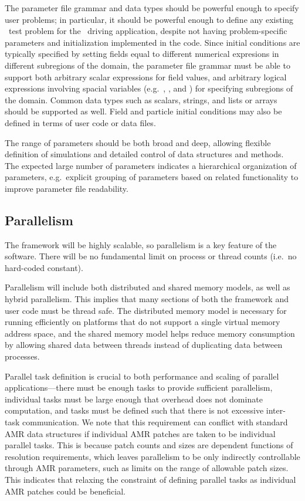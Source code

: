 \documentclass[10pt]{article}
\begin{document}
The parameter file grammar and data types should be powerful enough to
specify user problems; in particular, it should be powerful enough to
define any existing \enzo\ test problem for the \enzoii\ driving
application, despite not having problem-specific parameters and
initialization implemented in the code.  Since initial conditions are
typically specified by setting fields equal to different numerical
expresions in different subregions of the domain, the parameter file
grammar must be able to support both arbitrary scalar expressions for
field values, and arbitrary logical expressions involving spacial
variables (e.g.~, , and ) for specifying
subregions of the domain.  Common data types such as scalars, strings,
and lists or arrays should be supported as well.  Field and particle
initial conditions may also be defined in terms of user code or data
files.

The range of parameters should be both broad and deep, allowing
flexible definition of simulations and detailed control of data
structures and methods.  The expected large number of parameters
indicates a hierarchical organization of parameters, e.g.~explicit
grouping of parameters based on related functionality to improve
parameter file readability.

\subsection{Parallelism} \label{ss:require-parallel}

The framework will be highly scalable, so parallelism is a key
feature of the software.  There will be no fundamental limit on
process or thread counts (i.e.~no hard-coded  constant).

Parallelism will include both distributed and shared memory models, as
well as hybrid parallelism.  This implies that many sections of both
the framework and user code must be thread safe.  The distributed
memory model is necessary for running efficiently on platforms that do
not support a single virtual memory address space, and the shared
memory model helps reduce memory consumption by allowing shared data
between threads instead of duplicating data between processes.

Parallel task definition is crucial to both performance and scaling of
parallel applications---there must be enough tasks to provide
sufficient parallelism, individual tasks must be large enough that
overhead does not dominate computation, and tasks must be defined such
that there is not excessive inter-task communication.  We note that
this requirement can conflict with standard AMR data structures if
individual AMR patches are taken to be individual parallel tasks.
This is because patch counts and sizes are dependent functions of
resolution requirements, which leaves parallelism to be only
indirectly controllable through AMR parameters, such as limits on the
range of allowable patch sizes.  This indicates that relaxing the
constraint of defining parallel tasks as individual AMR patches could
be beneficial.
\end{document}
